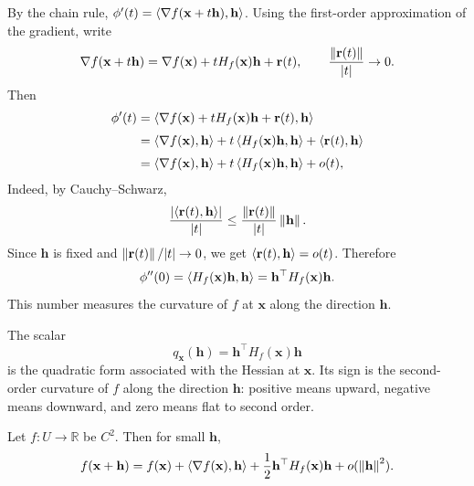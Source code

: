 By the chain rule, $\phi'(t)=\left\langle \nabla f(\mathbf{x}+t\mathbf{h}), \mathbf{h} \right\rangle$.
Using the first-order approximation of the gradient, write
\[
    \nabla f(\mathbf{x}+t\mathbf{h})
    =
    \nabla f(\mathbf{x})
    +
    tH_f(\mathbf{x})\mathbf{h}
    +
    \mathbf{r}(t),
    \qquad
    \frac{\left\lVert \mathbf{r}(t) \right\rVert}{|t|}\to0.
\]
Then
\[
\begin{aligned}
    \phi'(t)
    &=
    \left\langle 
        \nabla f(\mathbf{x})
        +
        tH_f(\mathbf{x})\mathbf{h}
        +
        \mathbf{r}(t)
    , \mathbf{h} \right\rangle                                                \\[1mm]
    &=
    \left\langle \nabla f(\mathbf{x}), \mathbf{h} \right\rangle
    +
    t\left\langle H_f(\mathbf{x})\mathbf{h}, \mathbf{h} \right\rangle
    +
    \left\langle \mathbf{r}(t), \mathbf{h} \right\rangle                     \\[1mm]
    &=
    \left\langle \nabla f(\mathbf{x}), \mathbf{h} \right\rangle
    +
    t\left\langle H_f(\mathbf{x})\mathbf{h}, \mathbf{h} \right\rangle
    +
    o(t),
\end{aligned}
\]
Indeed, by Cauchy--Schwarz,
\[
    \frac{
        \left|\left\langle \mathbf{r}(t), \mathbf{h} \right\rangle\right|
    }{|t|}
    \le
    \frac{\left\lVert \mathbf{r}(t) \right\rVert}{|t|}\left\lVert \mathbf{h} \right\rVert.
\]
Since $\mathbf{h}$ is fixed and $\left\lVert \mathbf{r}(t) \right\rVert/|t|\to0$, we get
$\left\langle \mathbf{r}(t), \mathbf{h} \right\rangle=o(t)$.
Therefore
\[
    \phi''(0)
    =
    \left\langle H_f(\mathbf{x})\mathbf{h}, \mathbf{h} \right\rangle
    =
    \mathbf{h}^{\top}H_f(\mathbf{x})\mathbf{h}.
\]
This number measures the curvature of $f$ at $\mathbf{x}$ along the direction
$\mathbf{h}$.



\begin{remark}
The scalar
\[
    q_{\mathbf{x}}(\mathbf{h})
    =
    \mathbf{h}^{\top}H_f(\mathbf{x})\mathbf{h}
\]
is the quadratic form associated with the Hessian at $\mathbf{x}$. Its sign is
the second-order curvature of $f$ along the direction $\mathbf{h}$: positive
means upward, negative means downward, and zero means flat to second order.
\end{remark}

\begin{proposition}
Let $f:U\to\mathbb{R}$ be $C^2$. Then for small $\mathbf{h}$,
\[
    f(\mathbf{x}+\mathbf{h})
    =
    f(\mathbf{x})
    +
    \left\langle \nabla f(\mathbf{x}), \mathbf{h} \right\rangle
    +
    \frac12\mathbf{h}^{\top}H_f(\mathbf{x})\mathbf{h}
    +
    o(\left\lVert \mathbf{h} \right\rVert^2).
\]
\end{proposition}

